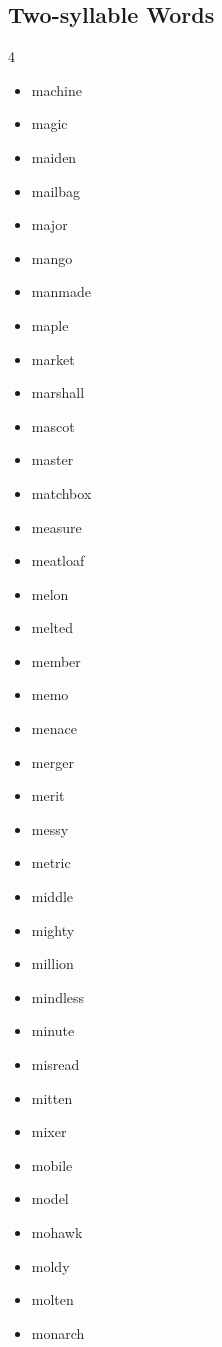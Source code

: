 \documentclass{article}
\begin{document}
\subsection*{Two-syllable Words}
\begin{multicols}{4}
    \begin{itemize}
        \item machine
        \item magic
        \item maiden
        \item mailbag
        \item major
        \item mango
        \item manmade
        \item maple
        \item market
        \item marshall
        \item mascot
        \item master
        \item matchbox
        \item measure
        \item meatloaf
        \item melon
        \item melted
        \item member
        \item memo
        \item menace
        \item merger
        \item merit
        \item messy
        \item metric
        \item middle
        \item mighty
        \item million
        \item mindless
        \item minute
        \item misread
        \item mitten
        \item mixer
        \item mobile
        \item model
        \item mohawk
        \item moldy
        \item molten
        \item monarch

\end{itemize}
\end{multicols}
\end{document}
